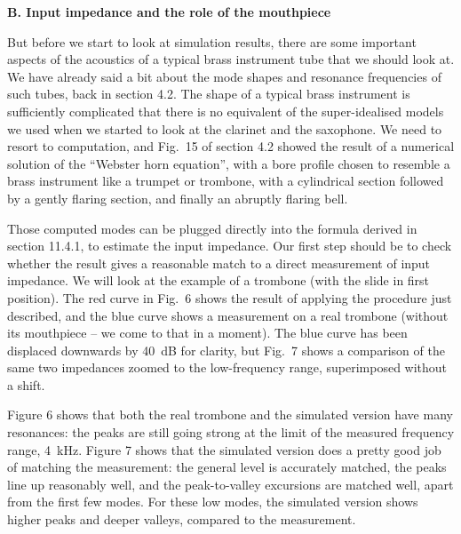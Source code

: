   \textbf{B. Input impedance and the role of the mouthpiece} 

  But before we start to look at simulation results, there are some important 
  aspects of the acoustics of a typical brass instrument tube that we should 
  look at. We have already said a bit about the mode shapes and resonance 
  frequencies of such tubes, back in section 4.2. The shape of a typical brass 
  instrument is sufficiently complicated that there is no equivalent of the 
  super-idealised models we used when we started to look at the clarinet and 
  the saxophone. We need to resort to computation, and Fig.\ 15 of section 4.2 
  showed the result of a numerical solution of the “Webster horn equation”, 
  with a bore profile chosen to resemble a brass instrument like a trumpet or 
  trombone, with a cylindrical section followed by a gently flaring section, 
  and finally an abruptly flaring bell. 

  Those computed modes can be plugged directly into the formula derived in 
  section 11.4.1, to estimate the input impedance. Our first step should be to 
  check whether the result gives a reasonable match to a direct measurement of 
  input impedance. We will look at the example of a trombone (with the slide in 
  first position). The red curve in Fig.\ 6 shows the result of applying the 
  procedure just described, and the blue curve shows a measurement on a real 
  trombone (without its mouthpiece -- we come to that in a moment). The blue 
  curve has been displaced downwards by 40~dB for clarity, but Fig.\ 7 shows a 
  comparison of the same two impedances zoomed to the low-frequency range, 
  superimposed without a shift. 

  Figure 6 shows that both the real trombone and the simulated version have 
  many resonances: the peaks are still going strong at the limit of the 
  measured frequency range, 4~kHz. Figure 7 shows that the simulated version 
  does a pretty good job of matching the measurement: the general level is 
  accurately matched, the peaks line up reasonably well, and the peak-to-valley 
  excursions are matched well, apart from the first few modes. For these low 
  modes, the simulated version shows higher peaks and deeper valleys, compared 
  to the measurement. 


